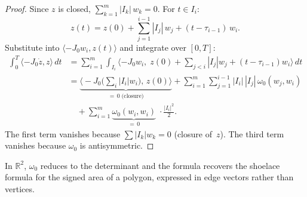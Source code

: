 \begin{proof}
Since $z$ is closed, $\sum_{k=1}^m |I_k|\, w_k = 0$.
For $t \in I_i$:
\[
  z(t) = z(0) + \sum_{j=1}^{i-1} |I_j|\, w_j
    + (t - \tau_{i-1})\, w_i.
\]
Substitute into
$\langle -J_0 w_i, z(t) \rangle$ and integrate over $[0, T]$:
\begin{align*}
\int_0^T \!\langle{-}J_0 \dot{z}, z \rangle \, dt
  &= \sum_{i=1}^m \int_{I_i}
    \!\langle -J_0 w_i,\;
      z(0) + \textstyle\sum_{j < i} |I_j| w_j
      + (t{-}\tau_{i-1}) w_i
    \rangle\, dt \\
  &= \underbrace{
      \bigl\langle -J_0 \bigl(\textstyle\sum_i |I_i| w_i\bigr),\,
      z(0) \bigr\rangle
    }_{= \, 0 \;\text{(closure)}}
  + \sum_{i=1}^m \sum_{j=1}^{i-1}
      |I_i|\, |I_j|\, \omega_0(w_j, w_i) \\
  &\quad
  + \sum_{i=1}^m
      \underbrace{\omega_0(w_i, w_i)}_{= \, 0}\;
      \cdot \tfrac{|I_i|^2}{2}.
\end{align*}
The first term vanishes because
$\sum |I_k| w_k = 0$ (closure of~$z$).
The third term vanishes because
$\omega_0$ is antisymmetric.
\end{proof}

\begin{remark}\label{rem:shoelace-name}
In $\mathbb{R}^2$, $\omega_0$ reduces to the determinant and
the formula recovers the shoelace formula for the signed area of a
polygon, expressed in edge vectors rather than vertices.
\end{remark}
